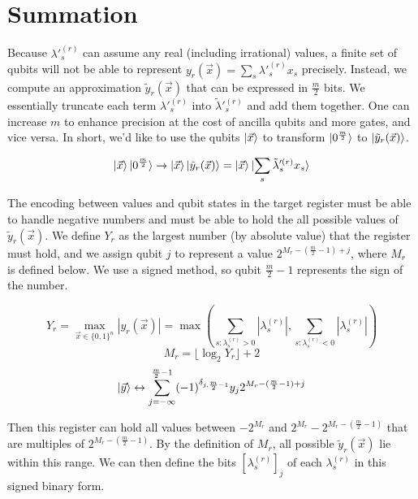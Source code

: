 \section{Summation}

Because $\lambda'^{(r)}_s$ can assume any real (including irrational) values, a finite set of qubits will not be able to represent $y_r(\vec{x}) = \sum_s \lambda'^{(r)}_s x_s$ precisely. Instead, we compute an approximation $\tilde{y}_r(\vec{x})$ that can be expressed in $\frac{m}{2}$ bits. We essentially truncate each term $\lambda'^{(r)}_s$ into $\tilde{\lambda}'^{(r)}_s$ and add them together. One can increase $m$ to enhance precision at the cost of ancilla qubits and more gates, and vice versa. In short, we'd like to use the qubits $\ket{\vec{x}}$ to transform $\ket{0^{\frac{m}{2}}}$ to $\ket{\tilde{y}_r(\vec{x})}$.

\begin{equation}
    \ket{\vec{x}}\ket{0^{\frac{m}{2}}} \rightarrow \ket{\vec{x}}\ket{\tilde{y}_r(\vec{x})} = \ket{\vec{x}}\ket{\sum_s \tilde{\lambda}'^{(r)}_s x_s}
    \label{eq: summation2}
\end{equation}

The encoding between values and qubit states in the target register must be able to handle negative numbers and must be able to hold the all possible values of $\tilde{y}_r(\vec{x})$. We define $Y_r$ as the largest number (by absolute value) that the register must hold, and we assign qubit $j$ to represent a value $2^{M_r - (\frac{m}{2} - 1) + j}$, where $M_r$ is defined below. We use a signed method, so qubit $\frac{m}{2} - 1$ represents the sign of the number. 

\begin{equation}
    Y_r = \max_{\vec{x} \in \{0, 1\}^n} |y_r(\vec{x})| = \max\left(\sum_{s : \lambda^{(r)}_s > 0} |\lambda^{(r)}_s|, \sum_{s : \lambda^{(r)}_s < 0} |\lambda^{(r)}_s|\right)
\end{equation}
\begin{equation}
    M_r = \lfloor \log_2{Y_r} \rfloor + 2
\end{equation}
\begin{equation}
    \ket{\vec{y}} \leftrightarrow \sum_{j = -\infty}^{\frac{m}{2} - 1} (-1)^{\delta_{j, \frac{m}{2} - 1}}y_j2^{M_r - (\frac{m}{2} - 1) + j}
\end{equation}

Then this register can hold all values between $-2^{M_r}$ and $2^{M_r} - 2^{M_r - (\frac{m}{2} - 1)}$ that are multiples of $2^{M_r - (\frac{m}{2} - 1)}$. By the definition of $M_r$, all possible $\tilde{y}_r(\vec{x})$ lie within this range. We can then define the bits $[\lambda^{(r)}_s]_j$ of each $\lambda^{(r)}_s$ in this signed binary form.


